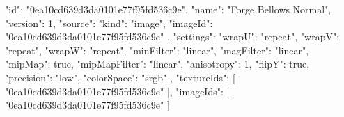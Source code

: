 {
  "id": "0ea10cd639d3da0101e77f95fd536c9e",
  "name": "Forge Bellows Normal",
  "version": 1,
  "source": {
    "kind": "image",
    "imageId": "0ea10cd639d3da0101e77f95fd536c9e"
  },
  "settings": {
    "wrapU": "repeat",
    "wrapV": "repeat",
    "wrapW": "repeat",
    "minFilter": "linear",
    "magFilter": "linear",
    "mipMap": true,
    "mipMapFilter": "linear",
    "anisotropy": 1,
    "flipY": true,
    "precision": "low",
    "colorSpace": "srgb"
  },
  "textureIds": [
    "0ea10cd639d3da0101e77f95fd536c9e"
  ],
  "imageIds": [
    "0ea10cd639d3da0101e77f95fd536c9e"
  ]
}
